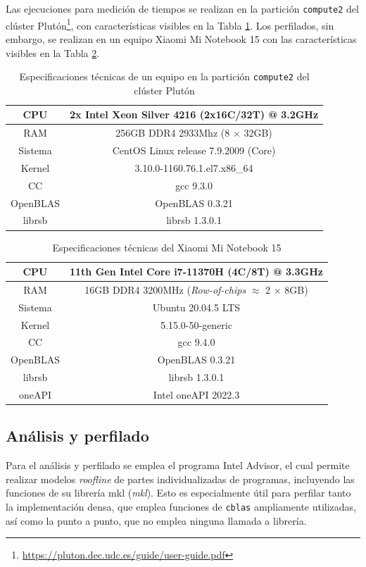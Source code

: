Las ejecuciones para medición de tiempos se realizan en la partición \texttt{compute2} del clúster Plutón\footnote{\url{https://pluton.dec.udc.es/guide/user-guide.pdf}}, con características visibles en la Tabla \ref{tb:especificaciones_compute2}. Los perfilados, sin embargo, se realizan en un equipo Xiaomi Mi Notebook 15 con las características visibles en la Tabla \ref{tb:especificaciones_xiaomi}.
\begin{table}[htpb]
\centering
\begin{tabular}{|c|c|}
    \hline
    CPU & 2x Intel Xeon Silver 4216 (2x16C/32T) @ 3.2GHz\\\hline
    RAM & 256GB DDR4 2933Mhz (8 $\times$ 32GB)\\\hline
    Sistema & CentOS Linux release 7.9.2009 (Core) \\\hline
    Kernel & 3.10.0-1160.76.1.el7.x86\_64 \\\hline
    CC & gcc 9.3.0\\\hline
    OpenBLAS & OpenBLAS 0.3.21\\\hline
    librsb & librsb 1.3.0.1\\\hline
\end{tabular}
\caption{\label{tb:especificaciones_compute2}Especificaciones técnicas de un equipo en la partición \texttt{compute2} del clúster Plutón}
\end{table}

\begin{table}[htpb]
\centering
\begin{tabular}{|c|c|}
    \hline
    CPU & 11th Gen Intel Core i7-11370H (4C/8T) @ 3.3GHz\\\hline
    RAM & 16GB DDR4 3200MHz (\textit{Row-of-chips} {\small$\approx$} 2 $\times$ 8GB)\\\hline
    Sistema & Ubuntu 20.04.5 LTS\\\hline
    Kernel & 5.15.0-50-generic \\\hline
    CC & gcc 9.4.0\\\hline
    OpenBLAS & OpenBLAS 0.3.21\\\hline
    librsb & librsb 1.3.0.1\\\hline
    oneAPI & Intel oneAPI 2022.3\\\hline
\end{tabular}
\caption{\label{tb:especificaciones_xiaomi}Especificaciones técnicas del Xiaomi Mi Notebook 15}
\end{table}

\subsection{Análisis y perfilado}
\label{ssec:analisis_perfilado_metodologia}
Para el análisis y perfilado se emplea el programa Intel Advisor, el cual permite realizar modelos \textit{roofline} de partes individualizadas de programas, incluyendo las funciones de su librería \acrshort{mkl} (\textit{\acrlong{mkl}}). Esto es especialmente útil para perfilar tanto la implementación densa, que emplea funciones de \texttt{cblas} ampliamente utilizadas, así como la punto a punto, que no emplea ninguna llamada a librería.

